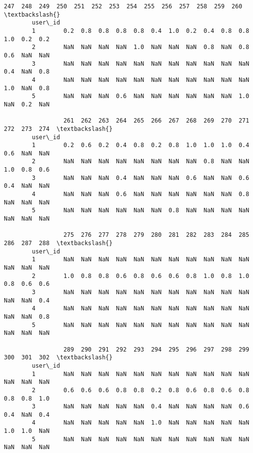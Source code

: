 \documentclass[11pt]{article}
\begin{document}
\begin{Verbatim}[commandchars=\\\{\}]
                 247  248  249  250  251  252  253  254  255  256  257  258  259  260  \textbackslash{}
        user\_id                                                                         
        1        0.2  0.8  0.8  0.8  0.8  0.4  1.0  0.2  0.4  0.8  0.8  1.0  0.2  0.2   
        2        NaN  NaN  NaN  NaN  1.0  NaN  NaN  NaN  0.8  NaN  0.8  0.6  NaN  NaN   
        3        NaN  NaN  NaN  NaN  NaN  NaN  NaN  NaN  NaN  NaN  NaN  0.4  NaN  0.8   
        4        NaN  NaN  NaN  NaN  NaN  NaN  NaN  NaN  NaN  NaN  NaN  1.0  NaN  0.8   
        5        NaN  NaN  NaN  0.6  NaN  NaN  NaN  NaN  NaN  NaN  1.0  NaN  0.2  NaN   
        
                 261  262  263  264  265  266  267  268  269  270  271  272  273  274  \textbackslash{}
        user\_id                                                                         
        1        0.2  0.6  0.2  0.4  0.8  0.2  0.8  1.0  1.0  1.0  0.4  0.6  NaN  NaN   
        2        NaN  NaN  NaN  NaN  NaN  NaN  NaN  NaN  0.8  NaN  NaN  1.0  0.8  0.6   
        3        NaN  NaN  NaN  0.4  NaN  NaN  NaN  0.6  NaN  NaN  0.6  0.4  NaN  NaN   
        4        NaN  NaN  NaN  0.6  NaN  NaN  NaN  NaN  NaN  NaN  0.8  NaN  NaN  NaN   
        5        NaN  NaN  NaN  NaN  NaN  NaN  0.8  NaN  NaN  NaN  NaN  NaN  NaN  NaN   
        
                 275  276  277  278  279  280  281  282  283  284  285  286  287  288  \textbackslash{}
        user\_id                                                                         
        1        NaN  NaN  NaN  NaN  NaN  NaN  NaN  NaN  NaN  NaN  NaN  NaN  NaN  NaN   
        2        1.0  0.8  0.8  0.6  0.8  0.6  0.6  0.8  1.0  0.8  1.0  0.8  0.6  0.6   
        3        NaN  NaN  NaN  NaN  NaN  NaN  NaN  NaN  NaN  NaN  NaN  NaN  NaN  0.4   
        4        NaN  NaN  NaN  NaN  NaN  NaN  NaN  NaN  NaN  NaN  NaN  NaN  NaN  0.8   
        5        NaN  NaN  NaN  NaN  NaN  NaN  NaN  NaN  NaN  NaN  NaN  NaN  NaN  NaN   
        
                 289  290  291  292  293  294  295  296  297  298  299  300  301  302  \textbackslash{}
        user\_id                                                                         
        1        NaN  NaN  NaN  NaN  NaN  NaN  NaN  NaN  NaN  NaN  NaN  NaN  NaN  NaN   
        2        0.6  0.6  0.6  0.8  0.8  0.2  0.8  0.6  0.8  0.6  0.8  0.8  0.8  1.0   
        3        NaN  NaN  NaN  NaN  NaN  0.4  NaN  NaN  NaN  NaN  0.6  0.4  NaN  0.4   
        4        NaN  NaN  NaN  NaN  NaN  1.0  NaN  NaN  NaN  NaN  NaN  1.0  1.0  NaN   
        5        NaN  NaN  NaN  NaN  NaN  NaN  NaN  NaN  NaN  NaN  NaN  NaN  NaN  NaN   
        

\end{Verbatim}
\end{document}
